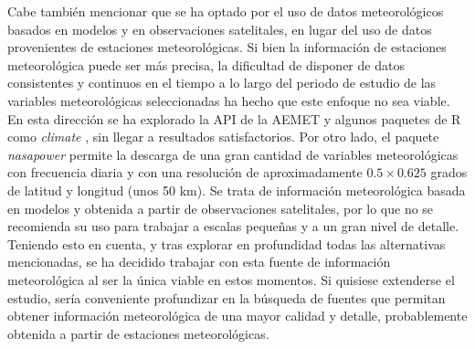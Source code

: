 \documentclass[12pt,a4paper,]{book}
\numberwithin{dummy}{section}
\theoremstyle{ocrenumbox}
\theoremstyle{blacknumex}
\theoremstyle{blacknumbox}
\theoremstyle{ocrenum}
\theoremstyle{ocrenum}
\begin{document}
Cabe también mencionar que se ha optado por el uso de datos
meteorológicos basados en modelos y en observaciones satelitales, en
lugar del uso de datos provenientes de estaciones meteorológicas. Si
bien la información de estaciones meteorológica puede ser más precisa,
la dificultad de disponer de datos consistentes y continuos en el tiempo
a lo largo del periodo de estudio de las variables meteorológicas
seleccionadas ha hecho que este enfoque no sea viable. En esta dirección
se ha explorado la API de la AEMET y algunos paquetes de R como
\emph{climate} \citep{climate}, sin llegar a resultados satisfactorios.
Por otro lado, el paquete \emph{nasapower} \citep{nasapower} permite la
descarga de una gran cantidad de variables meteorológicas con frecuencia
diaria y con una resolución de aproximadamente \(0.5 \times 0.625\)
grados de latitud y longitud (unos 50 km). Se trata de información
meteorológica basada en modelos y obtenida a partir de observaciones
satelitales, por lo que no se recomienda su uso para trabajar a escalas
pequeñas y a un gran nivel de detalle. Teniendo esto en cuenta, y tras
explorar en profundidad todas las alternativas mencionadas, se ha
decidido trabajar con esta fuente de información meteorológica al ser la
única viable en estos momentos. Si quisiese extenderse el estudio, sería
conveniente profundizar en la búsqueda de fuentes que permitan obtener
información meteorológica de una mayor calidad y detalle, probablemente
obtenida a partir de estaciones meteorológicas.
\end{document}
